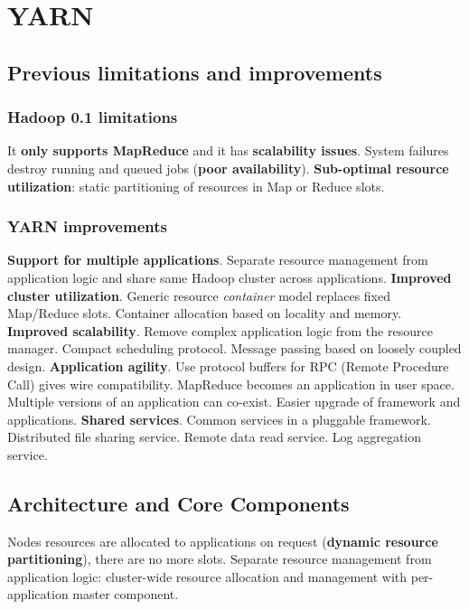 \section{YARN}
	\subsection{Previous limitations and improvements}
		\subsubsection{Hadoop 0.1 limitations}
		It \textbf{only supports MapReduce} and it has \textbf{scalability issues}. System failures destroy running and queued jobs (\textbf{poor availability}). \textbf{Sub-optimal resource utilization}: static partitioning of resources in Map or Reduce slots.
		\subsubsection{YARN improvements}
		\textbf{Support for multiple applications}. Separate resource management from application logic and share same Hadoop cluster across applications.\newline
		\newline
		\textbf{Improved cluster utilization}. Generic resource \textit{container} model replaces fixed Map/Reduce slots. Container allocation based on locality and memory.\newline
		\newline
		\textbf{Improved scalability}. Remove complex application logic from the resource manager. Compact scheduling protocol. Message passing based on loosely coupled design.\newline
		\newline
		\textbf{Application agility}. Use protocol buffers for RPC (Remote Procedure Call) gives wire compatibility. MapReduce becomes an application in user space. Multiple versions of an application can co-exist. Easier upgrade of framework and applications.\newline
		\newline
		\textbf{Shared services}. Common services in a pluggable framework. Distributed file sharing service. Remote data read service. Log aggregation service.
		 
	\subsection{Architecture and Core Components}
	Nodes resources are allocated to applications on request (\textbf{dynamic resource partitioning}), there are no more slots.\newline
	Separate resource management from application logic: cluster-wide resource allocation and management with per-application master component.
